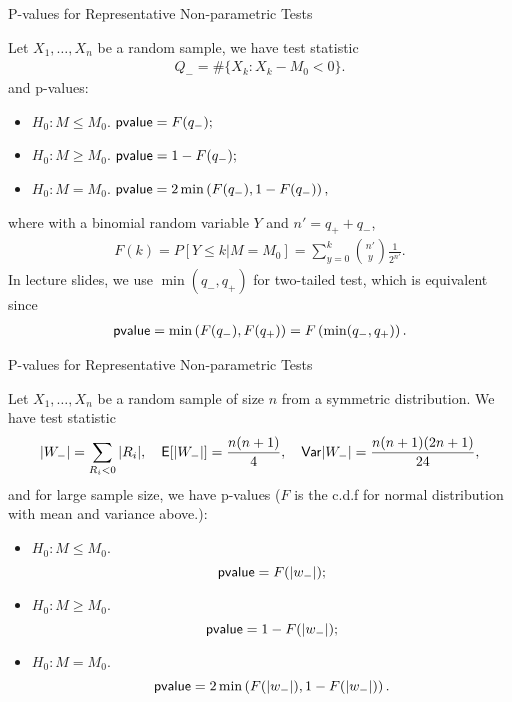 \begin{frame}{P-values for Representative Non-parametric Tests}

\justifying
{} Let $X_1, \ldots, X_n$ be a random sample, we have test statistic
\begin{align*}
Q_- = \#\{X_k: X_k - M_0 < 0 \}.
\end{align*}
and p-values:
\begin{itemize}
	\item \underline{$H_0: M \leq M_0$}. $\mathsf{pvalue} = F(q_-);$
	\item \underline{$H_0: M \geq M_0$}. $\mathsf{pvalue} = 1 - F(q_-);$
	\item \underline{$H_0: M = M_0$}. $\mathsf{pvalue} = 2\min \left(F(q_-), 1 - F(q_-)\right),$
\end{itemize}
where with a binomial random variable $Y$ and $n' = q_+ + q_-$,
\begin{align*}
F(k) = P[Y\leq k|M=M_0] = \sum_{y=0}^k\binom{n'}{y}\frac{1}{2^{n'}}.
\end{align*}
 In lecture slides, we use $\min(q_-, q_+)$ for two-tailed test, which is equivalent since
\begin{align*}
\mathsf{pvalue} = \min\left(F(q_-), F(q_+) \right) = F\left(\min(q_-, q_+) \right).
\end{align*}


\end{frame}


\begin{frame}{P-values for Representative Non-parametric Tests}

\justifying
{} Let $X_1, \ldots, X_n$ be a random sample of size $n$ from a symmetric distribution. We have test statistic
\footnotesize
\begin{align*}
|W_-| = \sum_{R_i < 0} |R_i|, \quad \mathsf{E}[|W_-|] = \frac{n(n+1)}{4}, \quad \mathsf{Var}|W_-| = \frac{n(n+1)(2n+1)}{24},
\end{align*}
\normalsize
and for large sample size, we have p-values ($F$ is the c.d.f for normal distribution with mean and variance above.):
\begin{itemize}
	\item \underline{$H_0: M \leq M_0$}. $$\mathsf{pvalue} = F(|w_-|);$$
	\item \underline{$H_0: M \geq M_0$}. $$\mathsf{pvalue} = 1 - F(|w_-|);$$
	\item \underline{$H_0: M = M_0$}. $$\mathsf{pvalue} = 2\min \left(F(|w_-|), 1 - F(|w_-|)\right).$$
\end{itemize}



\end{frame}


